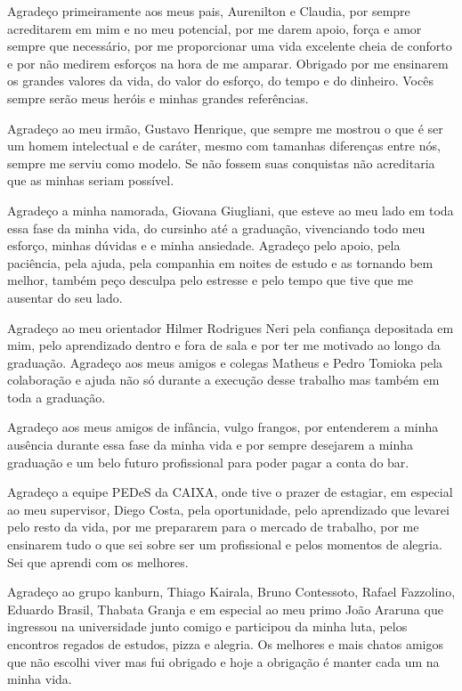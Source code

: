 \begin{agradecimentos}

Agradeço primeiramente aos meus pais, Aurenilton e Claudia, por sempre acreditarem em mim e no meu potencial, por me darem apoio, força e amor sempre que necessário, por me proporcionar uma vida excelente cheia de conforto e por não medirem esforços na hora de me amparar. Obrigado por me ensinarem os grandes valores da vida, do valor do esforço, do tempo e do dinheiro. Vocês sempre serão meus heróis e minhas grandes referências.

Agradeço ao meu irmão, Gustavo Henrique, que sempre me mostrou o que é ser um homem intelectual e de caráter, mesmo com tamanhas diferenças entre nós, sempre me serviu como modelo. Se não fossem suas conquistas não acreditaria que as minhas seriam possível.

Agradeço a minha namorada, Giovana Giugliani, que esteve ao meu lado em toda essa fase da minha vida, do cursinho até a graduação, vivenciando todo meu esforço,  minhas dúvidas e e minha ansiedade. Agradeço pelo apoio, pela paciência, pela ajuda, pela companhia em noites de estudo e as tornando bem melhor, também peço desculpa pelo estresse e pelo tempo que tive que me ausentar do seu lado. 

Agradeço ao meu orientador Hilmer Rodrigues Neri pela confiança depositada em mim, pelo aprendizado dentro e fora de sala e por ter me motivado ao longo da graduação. Agradeço aos meus amigos e colegas Matheus e Pedro Tomioka pela colaboração e ajuda não só durante a execução desse trabalho mas também em toda a graduação.

Agradeço aos meus amigos de infância, vulgo frangos, por entenderem a minha ausência durante essa fase da minha vida e por sempre desejarem a minha graduação e um belo futuro profissional para poder pagar a conta do bar.

Agradeço a equipe PEDeS da CAIXA, onde tive o prazer de estagiar, em especial ao meu supervisor, Diego Costa, pela oportunidade, pelo aprendizado que levarei pelo resto da vida, por me prepararem para o mercado de trabalho, por me ensinarem tudo o que sei sobre ser um profissional e pelos momentos de alegria. Sei que aprendi com os melhores.

Agradeço ao grupo kanburn, Thiago Kairala, Bruno Contessoto, Rafael Fazzolino, Eduardo Brasil, Thabata Granja e em especial ao meu primo João Araruna que ingressou na universidade junto comigo e participou da minha luta, pelos encontros regados de estudos, pizza e alegria. Os melhores e mais chatos amigos que não escolhi viver mas fui obrigado e hoje a obrigação é manter cada um na minha vida.

\end{agradecimentos}